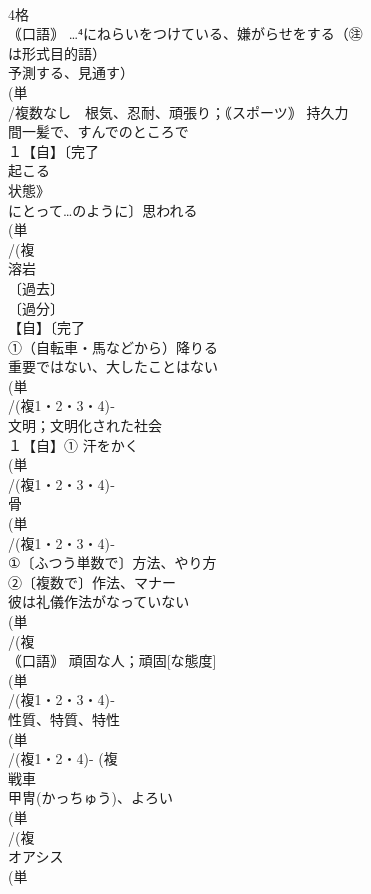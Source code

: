 \documentclass[8pt]{extreport}
\begin{document}
\begin{CJK}{UTF8}{min}
\\	4格 
\\	｟口語｠ …⁴にねらいをつけている、嫌がらせをする（㊟
\\	は形式目的語） 
\\	予測する、見通す） 
\\	(単
\\	/複数なし　根気、忍耐、頑張り；｟スポーツ｠ 持久力
\\	間一髪で、すんでのところで
\\	１【自】〔完了
\\	起こる 
\\	状態》
\\	にとって…のように〕思われる
\\	(単
\\	/(複
\\	溶岩 
\\	〔過去〕
\\	〔過分〕
\\	【自】〔完了
\\	①（自転車・馬などから）降りる 
\\	重要ではない、大したことはない
\\	(単
\\	/(複1・2・3・4)‐
\\	文明；文明化された社会 
\\	１【自】① 汗をかく 
\\	(単
\\	/(複1・2・3・4)‐　
\\	骨 
\\	(単
\\	/(複1・2・3・4)‐
\\	①〔ふつう単数で〕方法、やり方 
\\	②〔複数で〕作法、マナー　
\\	彼は礼儀作法がなっていない 
\\	(単
\\	/(複
\\	｟口語｠ 頑固な人；頑固[な態度] 
\\	(単
\\	/(複1・2・3・4)‐
\\	性質、特質、特性 
\\	(単
\\	/(複1・2・4)- (複
\\	戦車　
\\	甲冑(かっちゅう)、よろい
\\	(単
\\	/(複
\\	オアシス 
\\	(単

\end{CJK}
\end{document}
